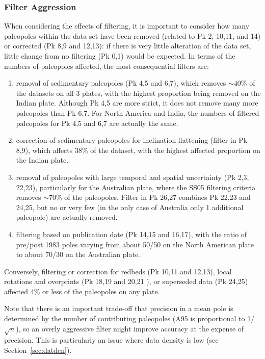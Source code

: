 \subsubsection{Filter Aggression}

When considering the effects of filtering, it is important to consider how many
paleopoles within the data set have been removed (related to Pk 2,
10,11, and 14) or corrected (Pk 8,9 and 12,13): if there is very
little alteration of the data set, little change from no filtering (Pk 0,1)
would be expected. In terms of the numbers of paleopoles affected, the most
consequential filters are:
%
\begin{enumerate}
  \item removal of sedimentary paleopoles (Pk 4,5 and 6,7), which removes
		${\sim}40$\% of the datasets on all 3 plates, with the
		highest proportion being removed on the Indian plate. Although Pk 4,5
		are more strict, it does not remove many more paleopoles than Pk 6,7.
		For North America and India, the numbers of filtered paleopoles for Pk
		4,5 and 6,7 are actually the same.
  \item correction of sedimentary paleopoles for inclination flattening (filter
		in Pk 8,9), which affects 38\% of the dataset, with the
		highest affected proportion on the Indian plate.
  \item removal of paleopoles with large temporal and spatial uncertainty (Pk
		2,3, 22,23), particularly for the Australian plate, where the SS05
		filtering criteria removes ${\sim}70$\% of the paleopoles. Filter in Pk
		26,27 combines Pk 22,23 and 24,25, but no or very few (in the only case
		of Australia only 1 additional paleopole) are actually removed.
  \item filtering based on publication date (Pk 14,15 and 16,17), with the
		ratio of pre/post 1983 poles varying from about 50/50 on the North
		American plate to about 70/30 on the Australian plate.
\end{enumerate}

Conversely, filtering or correction for redbeds (Pk 10,11 and 12,13), local
rotations and overprints (Pk 18,19 and 20,21%
), or superseded data (Pk 24,25) affected 4\% or less of
the paleopoles on any plate.

Note that there is an important trade-off that precision in a mean pole is
determined by the number of contributing paleopoles (A95 is proportional to
1/$\sqrt{n}$), so an overly aggressive filter might improve accuracy at the
expense of precision. This is particularly an issue where data density is low
(see Section~\ref{sec:datden}).

